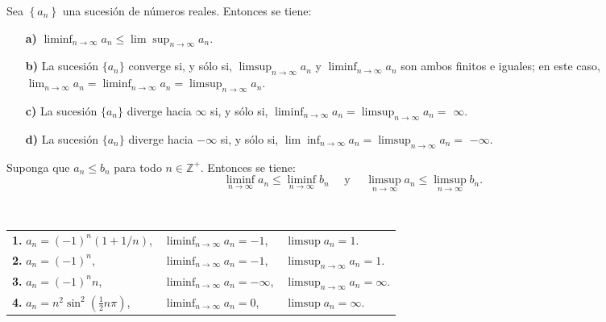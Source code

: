 \begin{theorem}
  Sea $\left\{a_n\right\}$ una sucesión de números reales. Entonces se tiene:
  \begin{itemize}
    \item[\textbf{a)}] $\liminf _{n \rightarrow \infty} a_n \leq \lim\sup _{n \rightarrow \infty} a_n$.
    \item[\textbf{b)}] La sucesión $\lbrace{a_n\rbrace}$ converge si, y sólo si, $\limsup _{n \rightarrow \infty} a_n$ y $\liminf _{n \rightarrow \infty} a_n$ son ambos finitos e iguales; en este caso, $\lim _{n \rightarrow \infty} a_n=\liminf _{n \rightarrow \infty} a_n=\limsup _{n \rightarrow \infty} a_n$.
    \item[\textbf{c)}] La sucesión $\lbrace{a_n\rbrace}$ diverge hacia $\infty$ si, y sólo si, $\liminf _{n \rightarrow \infty} a_n=\limsup _{n \rightarrow \infty} a_n=$ $\infty$.
    \item[\textbf{d)}] La sucesión $\lbrace{a_n\rbrace}$ diverge hacia $-\infty$ si, y sólo si, $\lim\inf _{n \rightarrow \infty} a_n=\limsup _{n \rightarrow \infty} a_n=$ $-\infty$.
  \end{itemize}
\end{theorem}
\begin{theorem}
  Suponga que $a_n \leq b_n$ para todo $n\in\mathbb{Z}^+$. Entonces se tiene:
  $$
    \liminf _{n \rightarrow \infty} a_n \leq \liminf _{n \rightarrow \infty} b_n \quad \text { y } \quad \limsup _{n \rightarrow \infty} a_n \leq \limsup _{n \rightarrow \infty} b_n .
  $$
\end{theorem}
\begin{example}
  \hspace{6cm} \\
  \begin{tabular}{l  l   l}
    \textbf{1.} $a_n=(-1)^n(1+1 / n)$,&$\liminf _{n \rightarrow \infty} a_n=-1$,&$\limsup a_n=1$.\\
    \textbf{2.} $a_n=(-1)^n$,&$\liminf _{n \rightarrow \infty} a_n=-1$,&$\limsup _{n \rightarrow \infty} a_n=1$.\\
    \textbf{3.} $a_n=(-1)^n n$,&$\liminf _{n \rightarrow \infty} a_n=-\infty$,&$\limsup _{n \rightarrow \infty} a_n=\infty$.\\
    \textbf{4.} $a_n=n^2 \sin ^2\left(\frac{1}{2} n \pi\right)$,&$\liminf _{n \rightarrow \infty} a_n=0$,&$\limsup a_n=\infty$.
  \end{tabular}
\end{example}



